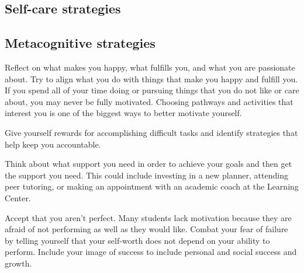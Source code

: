 \documentclass[../main.tex]{subfiles}
\begin{document}
\subsection{Self-care strategies}
\begin{cuenotes}
\end{cuenotes}
%
\subsection{Metacognitive strategies}
Reflect on what makes you happy, what fulfills you, and what you are passionate
about. Try to align what you do with things that make you happy and fulfill you.
If you spend all of your time doing or pursuing things that you do not like or
care about, you may never be fully motivated. Choosing pathways and activities
that interest you is one of the biggest ways to better motivate yourself.

Give yourself rewards for accomplishing difficult tasks and identify strategies
that help keep you accountable.

Think about what support you need in order to achieve your goals and then get
the support you need. This could include investing in a new planner, attending
peer tutoring, or making an appointment with an academic coach at the Learning
Center.

Accept that you aren’t perfect. Many students lack motivation because they are
afraid of not performing as well as they would like. Combat your fear of failure
by telling yourself that your self-worth does not depend on your ability to
perform. Include your image of success to include personal and social success
and growth.
\end{document}
